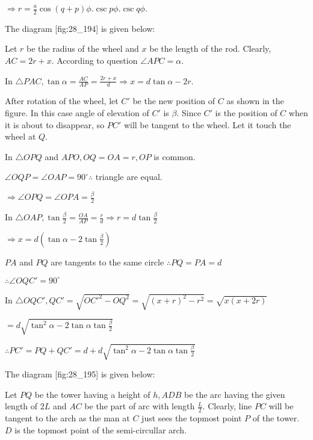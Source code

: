   $\Rightarrow r = \frac{a}{2}\cos(q + p)\phi.\csc p\phi.\csc q\phi$.

\item The diagram [fig:28_194] is given below:

  \startplacefigure[reference=fig:28_194]
    \externalfigure[28_194.pdf]
  \stopplacefigure

  Let $r$ be the radius of the wheel and $x$ be the length of the rod. Clearly, $AC =
  2r + x$. According to question $\angle APC = \alpha$.

  In $\triangle PAC, \tan\alpha = \frac{AC}{AP} = \frac{2r + x}{d} \Rightarrow x = d\tan\alpha -
  2r$.

  After rotation of the wheel, let $C'$ be the new position of $C$ as shown in the figure. In
  this case angle of elevation of $C'$ is $\beta$. Since $C'$ is the position of
  $C$ when it is about to disappear, so $PC'$ will be tangent to the wheel. Let it touch the
  wheel at $Q$.

  In $\triangle OPQ$ and $APO, OQ = OA = r, OP$ is common.

  $\angle OQP = \angle OAP = 90^\circ \therefore$ triangle are equal.

  $\Rightarrow \angle OPQ = \angle OPA = \frac{\beta}{2}$

  In $\triangle OAP, \tan\frac{\beta}{2} = \frac{OA}{AP} = \frac{r}{d} \Rightarrow r =
  d\tan\frac{\beta}{2}$

  $\Rightarrow x = d\left(\tan\alpha - 2\tan\frac{\beta}{2}\right)$

  $PA$ and $PQ$ are tangents to the same circle $\therefore PQ = PA = d$

  $\therefore \angle OQC' = 90^\circ$

  In $\triangle OQC', QC' = \sqrt{OC'^2 - OQ^2} = \sqrt{(x + r)^2 - r^2} = \sqrt{x(x + 2r)}$

  $= d\sqrt{\tan^2\alpha - 2\tan\alpha\tan\frac{\beta}{2}}$

  $\therefore PC' = PQ + QC' = d + d\sqrt{\tan^2\alpha - 2\tan\alpha\tan\frac{\beta}{2}}$

\item The diagram [fig:28_195] is given below:

  \startplacefigure[reference=fig:28_195]
    \externalfigure[28_195.pdf]
  \stopplacefigure

  Let $PQ$ be the tower having a height of $h, ADB$ be the arc having the given
  length of $2L$ and $AC$ be the part of arc with length $\frac{L}{2}$. Clearly, line
  $PC$ will be tangent to the arch as the man at $C$ just sees the topmost point $P$ of
  the tower. $D$ is the topmost point of the semi-circullar arch.

